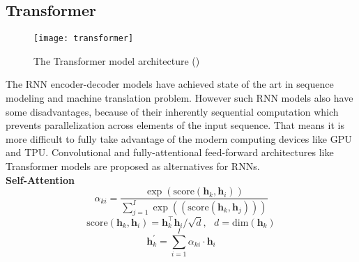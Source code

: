 \subsection{Transformer}
\begin{figure}[t]
	\texttt{[image: transformer]}
	\caption{The Transformer model architecture (\cite{vaswani2017attention})}
	\centering
\end{figure}
The RNN encoder-decoder models have achieved state of the art in sequence modeling and machine translation problem. However such RNN models also have some disadvantages, because of their inherently sequential computation which prevents parallelization across elements of the input sequence. That means it is more difficult to fully take advantage of the modern computing devices like GPU and TPU. Convolutional \cite{gehring2017convolutional} and fully-attentional feed-forward architectures like Transformer \cite{vaswani2017attention} models are proposed as alternatives for RNNs. \\

%
%
\textbf{Self-Attention}\\
\[ \alpha_{ki} = \frac{\exp(\text{score}(\bm{h}_k, \bm{h}_i))}{\sum_{j=1}^{I} \exp((\text{score}(\bm{h}_k, \bm{h}_j)))}\]
\[ \text{score}(\bm{h}_k, \bm{h}_i) = \bm{h}_k^\top \bm{h}_i /\sqrt{d} , \ \ \ d= \text{dim}(\bm{h}_k)\]
\[\bm{h}_k^{\prime} = \sum_{i=1}^{I} \alpha_{ki} \cdot \bm{h}_i\]

